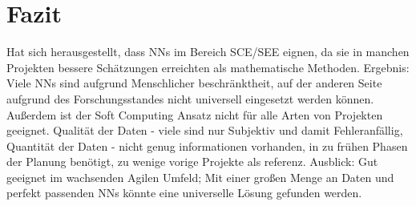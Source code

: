 \section{Fazit}
Hat sich herausgestellt, dass NNs im Bereich SCE/SEE eignen, da sie in manchen Projekten bessere Schätzungen erreichten als mathematische Methoden.
Ergebnis: Viele NNs sind aufgrund Menschlicher beschränktheit, auf der anderen Seite aufgrund des Forschungsstandes nicht universell eingesetzt werden können. Außerdem ist der Soft Computing Ansatz nicht für alle Arten von Projekten geeignet. Qualität der Daten - viele sind nur Subjektiv und damit Fehleranfällig, Quantität der Daten - nicht genug informationen vorhanden, in zu frühen Phasen der Planung benötigt, zu wenige vorige Projekte als referenz.
Ausblick: Gut geeignet im wachsenden Agilen Umfeld; Mit einer großen Menge an Daten und perfekt passenden NNs könnte eine universelle Lösung gefunden werden.